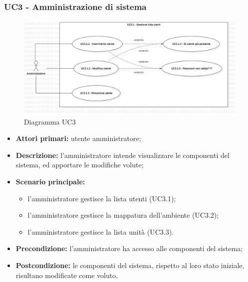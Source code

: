 \subsubsection{UC3 - Amministrazione di sistema}
	\begin{center}
		\begin{figure}[h!]
			\includegraphics[width=15cm]{images/uc3.1.jpg}
			\caption{Diagramma UC3}
		\end{figure}
	\end{center}
	\begin{itemize}
		\item \textbf{Attori primari:} utente amministratore;
		\item \textbf{Descrizione:} l'amministratore intende visualizzare le componenti del sistema, ed apportare le modifiche volute;
		\item \textbf{Scenario principale:} 
			\begin{itemize}
				\item l'amministratore gestisce la lista utenti (UC3.1);
				\item l'amministratore gestisce la mappatura dell'ambiente (UC3.2);
				\item l'amministratore gestisce la lista unità (UC3.3).
			\end{itemize}
		\item \textbf{Precondizione:} l'amministratore ha accesso alle componenti del sistema;
		\item \textbf{Postcondizione:} le componenti del sistema, rispetto al loro stato iniziale, risultano modificate come voluto.
	\end{itemize}
	
